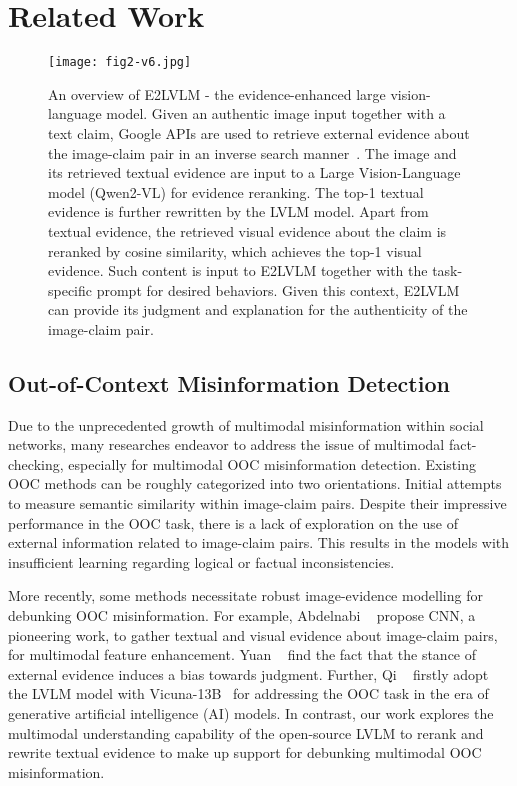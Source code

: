 \section{Related Work}
\label{sec:Related Work}

\begin{figure*}[t]
  \texttt{[image: fig2-v6.jpg]}
  \caption{An overview of E2LVLM - the evidence-enhanced large vision-language model. Given an authentic image input together with a text claim, Google APIs are used to retrieve external evidence about the image-claim pair in an inverse search manner~\cite{abdelnabi2022open}. The image and its retrieved textual evidence are input to a Large Vision-Language model (Qwen2-VL) for evidence reranking. The top-1 textual evidence is further rewritten by the LVLM model. Apart from textual evidence, the retrieved visual evidence about the claim is reranked by cosine similarity, which achieves the top-1 visual evidence. Such content is input to E2LVLM together with the task-specific prompt for desired behaviors. Given this context, E2LVLM can provide its judgment and explanation for the authenticity of the image-claim pair.}
  \label{fig:2}
\end{figure*}

\subsection{Out-of-Context Misinformation Detection}
Due to the unprecedented growth of multimodal misinformation within social networks, many researches endeavor to address the issue of multimodal fact-checking, especially for multimodal OOC misinformation detection. Existing OOC methods can be roughly categorized into two orientations. Initial \cite{luo2021newsclippings, papadopoulos2023synthetic, gu2024learning} attempts to measure semantic similarity within image-claim pairs. Despite their impressive performance in the OOC task, there is a lack of exploration on the use of external information related to image-claim pairs. This results in the models with insufficient learning regarding logical or factual inconsistencies.

More recently, some methods \cite{zhang2023ecenet, wang2024mmidr, liu2024forgery} necessitate robust image-evidence modelling for debunking OOC misinformation. For example, Abdelnabi \etal~\cite{abdelnabi2022open} propose CNN, a pioneering work, to gather textual and visual evidence about image-claim pairs, for multimodal feature enhancement. Yuan \etal~\cite{yuan2023support} find the fact that the stance of external evidence induces a bias towards judgment. Further, Qi \etal~\cite{qi2024sniffer} firstly adopt the LVLM model with Vicuna-13B~\cite{vicuna2023} for addressing the OOC task in the era of generative artificial intelligence (AI) models. In contrast, our work explores the multimodal understanding capability of the open-source LVLM to rerank and rewrite textual evidence to make up support for debunking multimodal OOC misinformation.

